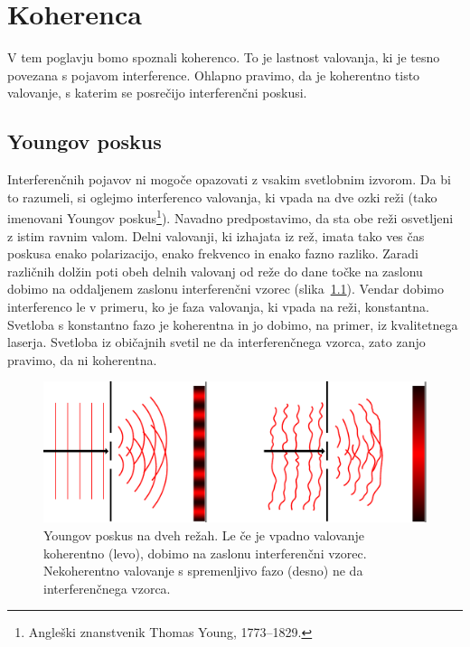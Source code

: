 
\chapter{Koherenca}

V tem poglavju bomo spoznali koherenco. To je lastnost
valovanja, ki je tesno povezana s pojavom interference. Ohlapno pravimo,
da je koherentno tisto valovanje, s katerim se posrečijo interferenčni
poskusi.  

\section{Youngov poskus}

Interferenčnih pojavov ni mogoče opazovati z
vsakim svetlobnim izvorom. Da bi to razumeli, si oglejmo interferenco
valovanja, ki vpada na dve ozki reži (tako imenovani Youngov 
poskus\footnote{Angleški znanstvenik Thomas Young, 1773--1829.}). 
Navadno predpostavimo, da
sta obe reži osvetljeni z istim ravnim valom. Delni valovanji, ki
izhajata iz rež, imata tako ves čas poskusa enako polarizacijo, enako
frekvenco in enako fazno razliko. Zaradi različnih dolžin poti obeh
delnih valovanj od reže do dane točke na zaslonu dobimo na oddaljenem
zaslonu interferenčni vzorec (slika~\ref{fig:Young}). Vendar dobimo 
interferenco le v primeru,
ko je faza valovanja, ki vpada na reži, konstantna. Svetloba s konstantno
fazo je koherentna in jo dobimo, na primer, iz kvalitetnega laserja.
Svetloba iz običajnih svetil ne da interferenčnega vzorca, zato zanjo
pravimo, da ni koherentna. 
\begin{figure}[h]
\centering
\includegraphics[width=10truecm]{slike/02_Young.pdf}
\caption{Youngov poskus na dveh režah. Le če je vpadno valovanje koherentno (levo), 
dobimo na zaslonu interferenčni vzorec. Nekoherentno valovanje s spremenljivo
fazo (desno) ne da interferenčnega vzorca.}
\label{fig:Young}
\end{figure}

